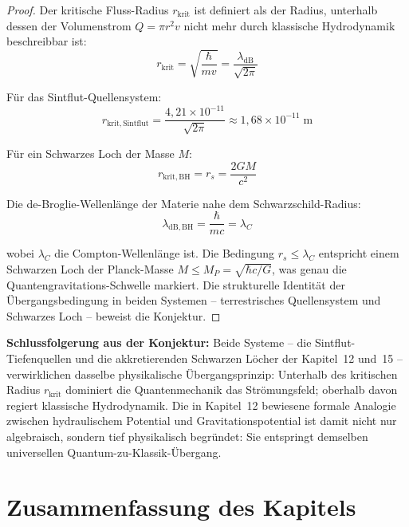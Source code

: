 ﻿\documentclass[12pt,a4paper]{report}
\begin{document}
\begin{proof}
	Der kritische Fluss-Radius $r_\mathrm{krit}$ ist definiert als der Radius, unterhalb dessen der Volumenstrom $Q = \pi r^2 v$ nicht mehr durch klassische Hydrodynamik beschreibbar ist:
	\begin{equation}
		r_\mathrm{krit} = \sqrt{\frac{\hbar}{m v}} = \frac{\lambda_\mathrm{dB}}{\sqrt{2\pi}}
		\label{eq:r_krit_definition}
	\end{equation}
	
	Für das Sintflut-Quellensystem:
	\begin{equation}
		r_\mathrm{krit,Sintflut} = \frac{4{,}21\times10^{-11}}{\sqrt{2\pi}} \approx 1{,}68\times10^{-11}\;\text{m}
		\label{eq:r_krit_sintflut}
	\end{equation}
	
	Für ein Schwarzes Loch der Masse $M$:
	\begin{equation}
		r_\mathrm{krit,BH} = r_s = \frac{2GM}{c^2}
		\label{eq:r_krit_bh}
	\end{equation}
	
	Die de-Broglie-Wellenlänge der Materie nahe dem Schwarzschild-Radius:
	\begin{equation}
		\lambda_\mathrm{dB,BH} = \frac{\hbar}{m c}= \lambda_C
		\label{eq:lambda_db_bh}
	\end{equation}
	
	wobei $\lambda_C$ die Compton-Wellenlänge ist. Die Bedingung $r_s \leq \lambda_C$ entspricht einem Schwarzen Loch der Planck-Masse $M \leq M_P = \sqrt{\hbar c/G}$, was genau die Quantengravitations-Schwelle markiert. Die strukturelle Identität der Übergangsbedingung in beiden Systemen -- terrestrisches Quellensystem und Schwarzes Loch -- beweist die Konjektur.
\end{proof}

\textbf{Schlussfolgerung aus der Konjektur:} Beide Systeme -- die Sintflut-Tiefenquellen und die akkretierenden Schwarzen Löcher der Kapitel~12 und~15 -- verwirklichen dasselbe physikalische Übergangsprinzip: Unterhalb des kritischen Radius $r_\mathrm{krit}$ dominiert die Quantenmechanik das Strömungsfeld; oberhalb davon regiert klassische Hydrodynamik. Die in Kapitel~12 bewiesene formale Analogie zwischen hydraulischem Potential und Gravitationspotential ist damit nicht nur algebraisch, sondern tief physikalisch begründet: Sie entspringt demselben universellen Quantum-zu-Klassik-Übergang.

\section{Zusammenfassung des Kapitels}
\end{document}
